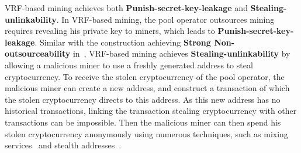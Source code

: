 VRF-based mining achieves both \textbf{Punish-secret-key-leakage} and \textbf{Stealing-unlinkability}.
In VRF-based mining, the pool operator outsources mining requires revealing his private key to miners, which leads to \textbf{Punish-secret-key-leakage}.
Similar with the construction achieving \textbf{Strong Non-outsourceability} in~\cite{miller2015nonoutsourceable}, VRF-based mining achieves \textbf{Stealing-unlinkability} by allowing a malicious miner to use a freshly generated address to steal cryptocurrency.
To receive the stolen cryptocurrency of the pool operator, the malicious miner can create a new address, and construct a transaction of which the stolen cryptocurrency directs to this address.
As this new address has no historical transactions, linking the transaction stealing cryptocurrency with other transactions can be impossible.
Then the malicious miner can then spend his stolen cryptocurrency anonymously using numerous techniques, such as mixing services~\cite{maxwell2013coinjoin}\cite{bonneau2014mixcoin}\cite{ruffing2014coinshuffle}\cite{heilman2017tumblebit} and stealth addresses~\cite{van2013cryptonote}.


